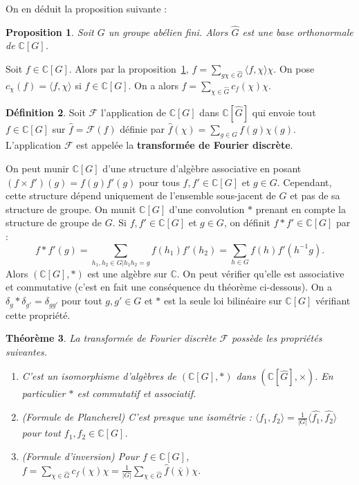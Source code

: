 \documentclass[a4paper]{article}
\theoremstyle{definition} %
\newtheorem{Def}{Définition}[section] %
\theoremstyle{plain} %
\newtheorem{Prop}[Def]{Proposition} %
\newtheorem{Thm}[Def]{Théorème} %
\theoremstyle{remark} %
\newcommand{\C}{\mathbb{C}}
\newcommand{\wg}{\widehat{G}}
\newcommand{\FS}{\mathscr{F}}
\begin{document}
On en déduit la proposition suivante : 

\begin{Prop}\label{propDual_base_orthonormée}
Soit $G$ un groupe abélien fini. Alors $\widehat{G}$ est une base orthonormale de $\C[G]$.
\end{Prop}


Soit $f\in \C[G]$. Alors par la proposition~\ref{propDual_base_orthonormée}, $f=\sum_{g\chi\in \wg}\langle f,\chi\rangle \chi$. On pose $c_\chi(f)=\langle f,\chi\rangle$ si $f\in \C[G]$. On a alors $f=\sum_{\chi\in \wg}c_f(\chi)\chi$.

\begin{Def}
Soit $\FS$ l'application de $\C[G]$ dans $\C[\wg]$ qui envoie tout $f\in \C[G]$ sur 
$\widehat{f}=\FS(f)$
 définie par $\widehat{f}(\chi)=\sum_{g\in G}f(g)\chi(g)$. L'application $\FS$ est appelée la \textbf{transformée de Fourier discrète}.
\end{Def}


On peut munir $\C[G]$ d'une structure d'algèbre associative en posant $(f\times f')(g)=f(g)f'(g)$ pour tous $f,f'\in\C[G]$ et $g\in G$. Cependant, cette structure dépend uniquement de l'ensemble sous-jacent de $G$ et pas de sa structure de groupe. On munit $\C[G]$ d'une convolution $*$ prenant en compte la structure de groupe de $G$. Si $f,f'\in \C[G]$ et $g\in G$, on définit $f*f'\in \C[G]$ par :  \[f*f'(g)=\sum_{h_1,h_2\in G|h_1h_2=g}f(h_1)f'(h_2)=\sum_{h\in G}f(h)f'(h^{-1}g).\] Alors $(\C[G],*)$ est une algèbre sur $\C$. On peut vérifier qu'elle est associative et commutative (c'est en fait une conséquence du théorème ci-dessous). On a $\delta_g*\delta_{g'}=\delta_{gg'}$ pour tout $g,g'\in G$ et $*$ est la seule loi bilinéaire sur $\C[G]$ vérifiant cette propriété.

\begin{Thm}\label{thmTransformée_Fourier_discrète}
La transformée de Fourier discrète $\FS$ possède les propriétés suivantes. \begin{enumerate}

\item C'est un isomorphisme d'algèbres de $(\C[G],*)$ dans $(\C[\wg],\times)$. En particulier $*$ est commutatif et associatif.

\item (Formule de Plancherel) C'est presque une isométrie  : $\langle f_1,f_2\rangle =\frac{1}{|G|}\langle \widehat{f_1},\widehat{f_2}\rangle$ pour tout $f_1,f_2\in \C[G]$.

\item (Formule d'inversion) Pour $f\in \C[G]$, $f=\sum_{\chi\in \wg} c_f(\chi)\chi=\frac{1}{|G|}\sum_{\chi\in \wg} \widehat{f}(\overline{\chi})\chi$. 
\end{enumerate}
\end{Thm}
\end{document}
